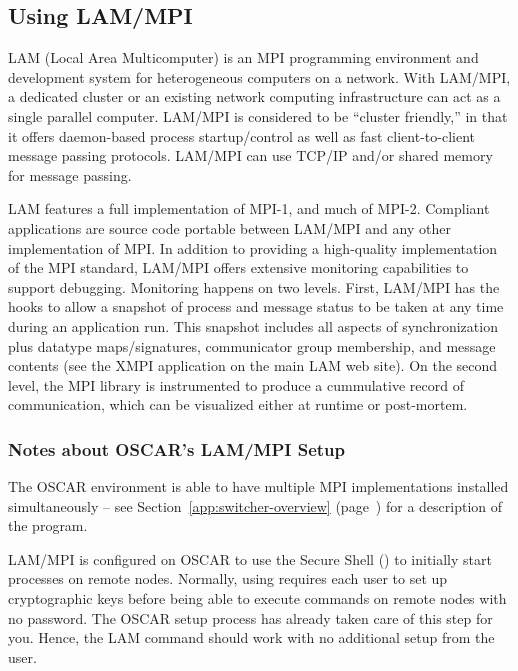 %
%

\subsection{Using LAM/MPI}
\label{app:lam-mpi-overview}

LAM (Local Area Multicomputer) is an MPI programming environment and
development system for heterogeneous computers on a network. With
LAM/MPI, a dedicated cluster or an existing network computing
infrastructure can act as a single parallel computer.  LAM/MPI is
considered to be ``cluster friendly,'' in that it offers daemon-based
process startup/control as well as fast client-to-client message
passing protocols.  LAM/MPI can use TCP/IP and/or shared memory for
message passing.

LAM features a full implementation of MPI-1, and much of MPI-2.
Compliant applications are source code portable between LAM/MPI and
any other implementation of MPI.  In addition to providing a
high-quality implementation of the MPI standard, LAM/MPI offers
extensive monitoring capabilities to support debugging.  Monitoring
happens on two levels.  First, LAM/MPI has the hooks to allow a
snapshot of process and message status to be taken at any time during
an application run.  This snapshot includes all aspects of
synchronization plus datatype maps/signatures, communicator group
membership, and message contents (see the XMPI application on the main
LAM web site).  On the second level, the MPI library is instrumented
to produce a cummulative record of communication, which can be
visualized either at runtime or post-mortem.

\subsubsection{Notes about OSCAR's LAM/MPI Setup}

The OSCAR environment is able to have multiple MPI implementations
installed simultaneously -- see Section~\ref{app:switcher-overview}
(page~\pageref{app:switcher-overview}) for a description of the
 program.  

LAM/MPI is configured on OSCAR to use the Secure Shell () to
initially start processes on remote nodes.  Normally, using 
requires each user to set up cryptographic keys before being able to
execute commands on remote nodes with no password.  The OSCAR setup
process has already taken care of this step for you.  Hence, the LAM
command  should work with no additional setup from the
user.

